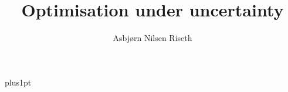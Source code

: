 \documentclass[12pt]{infommthesis}
\title{Optimisation under uncertainty}
\author{Asbj{\o}rn Nilsen Riseth}
\def\biblio{}
\begin{document}
\def\biblio{} %

\baselineskip=18pt plus1pt

\setcounter{secnumdepth}{3}
\setcounter{tocdepth}{3}

\maketitle                  %
\begin{dedication}
\end{dedication}

\begin{acknowledgementslong}
\end{acknowledgementslong}

\begin{abstractseparate}
\end{abstractseparate}

\begin{originalitylong}
  
\end{originalitylong}

\begin{romanpages}          %
  \listoftodos[Notes]
  \tableofcontents            %
  \listoffigures              %
  \listoftables               %
\end{romanpages}            %






\appendix



\end{document}
